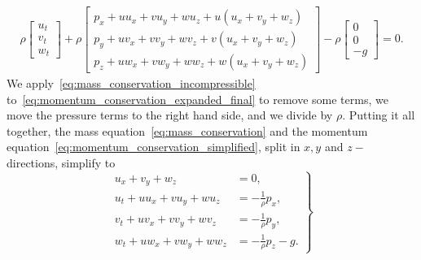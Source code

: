 \begin{align}\label{eq:momentum_conservation_expanded_final}
    \rho \begin{bmatrix}
        u_t \\ v_t \\ w_t
    \end{bmatrix}
    + \rho \begin{bmatrix}
        p_x + u u_x + v u_y + w u_z + u(u_x + v_y + w_z) \\
        p_y + u v_x + v v_y + w v_z + v(u_x + v_y + w_z) \\
        p_z + u w_x + v w_y + w w_z + w(u_x + v_y + w_z) 
    \end{bmatrix}
    - \rho \begin{bmatrix}
        0 \\ 0 \\ -g
    \end{bmatrix} = 0.
\end{align}
We apply~\eqref{eq:mass_conservation_incompressible} to~\eqref{eq:momentum_conservation_expanded_final} to remove some terms, we move the pressure terms to the right hand side, and we divide by $\rho$.
Putting it all together, the mass equation~\eqref{eq:mass_conservation} and the momentum equation~\eqref{eq:momentum_conservation_simplified}, split in $x, y$ and $z-$directions, simplify to 
\begin{equation}\label{eq:momentum_conservation_all}
    \left.
    \begin{aligned}
        u_x + v_y + w_z &= 0, \\
        u_t + u u_x + v u_y + w u_z &= - \frac{1}{\rho} p_x, \\
        v_t + u v_x + v v_y + w v_z &= - \frac{1}{\rho} p_y, \\
        w_t + u w_x + v w_y + w w_z &= - \frac{1}{\rho} p_z - g.
    \end{aligned}
    \right\}
\end{equation}


